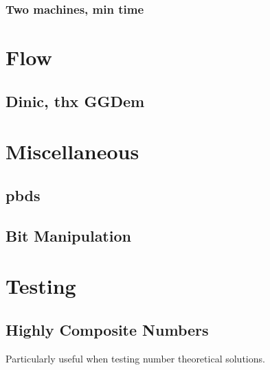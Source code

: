 \subsubsection{Two machines, min time}

\section{Flow}
\subsection{Dinic, thx GGDem}

\section{Miscellaneous}
\subsection{pbds}
\subsection{Bit Manipulation}


\section{Testing}
\subsection{Highly Composite Numbers}
Particularly useful when testing number theoretical solutions.





